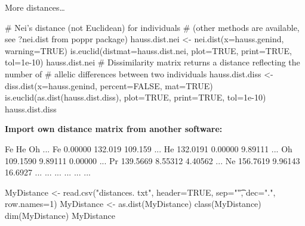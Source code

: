 \documentclass[compress, ucs, xelatex, 11pt, xcolor=svgnames,
  hyperref={
    bookmarks=true,
    unicode=true,
    colorlinks=true,
    pdftitle={Molecular data in R},
    plainpages=false,
    pdfauthor={Vojtech Zeisek},
    pdfsubject={Course about phylogeny and evolution in R},
    pdfcreator={XeLaTeX},
    pdfkeywords={R, evolution, phylogeny, molecular data},
    linkcolor=Tomato,
    anchorcolor=SaddleBrown,
    citecolor=Goldenrod,
    filecolor=DarkMagenta,
    menucolor=Sienna,
    urlcolor=DarkTurquoise,
    pdftex},
  url={hyphens, lowtilde} %
  ]{beamer}
\begin{document}
\begin{frame}[fragile]{More distances\ldots}
  \begin{spluscode}
    # Nei's distance (not Euclidean) for individuals
    # (other methods are available, see ?nei.dist from poppr package)
    hauss.dist.nei <- nei.dist(x=hauss.genind, warning=TRUE)
    is.euclid(distmat=hauss.dist.nei, plot=TRUE, print=TRUE, tol=1e-10)
    hauss.dist.nei
    # Dissimilarity matrix returns a distance reflecting the number of
    # allelic differences between two individuals
    hauss.dist.diss <- diss.dist(x=hauss.genind, percent=FALSE, mat=TRUE)
    is.euclid(as.dist(hauss.dist.diss), plot=TRUE, print=TRUE, tol=1e-10)
    hauss.dist.diss
  \end{spluscode}
\vfill
\textbf{Import own distance matrix from another software:}
\begin{multicols}{2}
  \begin{spluscode}
       Fe       He      Oh      ...
    Fe 0.00000  132.019 109.159 ...
    He 132.0191 0.00000 9.89111 ...
    Oh 109.1590 9.89111 0.00000 ...
    Pr 139.5669 8.55312 4.40562 ...
    Ne 156.7619 9.96143 16.6927 ...
    ... ...     ...     ...     ...
  \end{spluscode}
  \columnbreak
  \begin{spluscode}
    MyDistance <- read.csv("distances.
      txt", header=TRUE, sep="\t",
      dec=".", row.names=1)
    MyDistance <- as.dist(MyDistance)
    class(MyDistance)
    dim(MyDistance)
    MyDistance
  \end{spluscode}
\end{multicols}
\end{frame}
\end{document}

